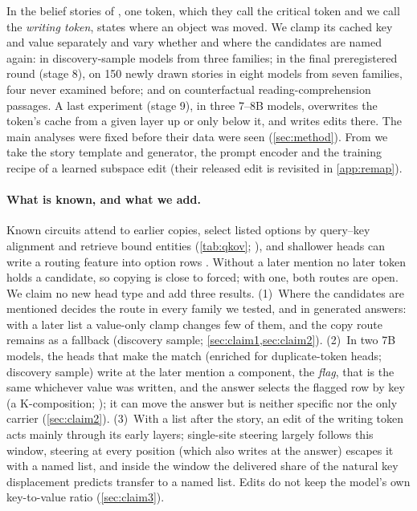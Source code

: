 In the belief stories of \citet{anonymous2026fitted}, one token, which they call the critical token and we call the \emph{writing token}, states where an object was moved. We clamp its cached key and value separately and vary whether and where the candidates are named again: in \nModels{} discovery-sample models from three families; in the final preregistered round (stage 8), on 150 newly drawn stories in eight models from seven families, four never examined before; and on counterfactual reading-comprehension passages. A last experiment (stage 9), in three 7--8B models, overwrites the token's cache from a given layer up or only below it, and writes edits there. The main analyses were fixed before their data were seen (\cref{sec:method}). From \citet{anonymous2026fitted} we take the story template and generator, the prompt encoder and the training recipe of a learned subspace edit (their released edit is revisited in \cref{app:remap}).

\paragraph{What is known, and what we add.}
Known circuits attend to earlier copies, select listed options by query--key alignment and retrieve bound entities (\cref{tab:qkov}; \citealp{tulchinskii2024wise,feng2023binding,dai2024binding,prakash2024finetuning,prakash2025lookbacks,gurarieh2025mixing}), and shallower heads can write a routing feature into option rows \citep{sun2026persuaded}. Without a later mention no later token holds a candidate, so copying is close to forced; with one, both routes are open. We claim no new head type and add three results.
(1)~Where the candidates are mentioned decides the route in every family we tested, and in generated answers: with a later list a value-only clamp changes few of them, and the copy route remains as a fallback (discovery sample; \cref{sec:claim1,sec:claim2}).
(2)~In two 7B models, the heads that make the match (enriched for duplicate-token heads; discovery sample) write at the later mention a component, the \emph{flag}, that is the same whichever value was written, and the answer selects the flagged row by key (a K-composition; \citealp{elhage2021framework}); it can move the answer but is neither specific nor the only carrier (\cref{sec:claim2}).
(3)~With a list after the story, an edit of the writing token acts mainly through its early layers; single-site steering largely follows this window, steering at every position (which also writes at the answer) escapes it with a named list, and inside the window the delivered share of the natural key displacement predicts transfer to a named list. Edits do not keep the model's own key-to-value ratio (\cref{sec:claim3}).
